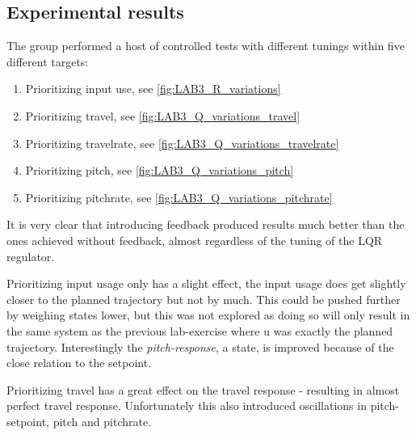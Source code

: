 \documentclass[../main.tex]{subfiles}
\begin{document}

\subsection{Experimental results}\label{sec:lab3_result}
The group performed a host of controlled tests with different tunings within five different targets:
\begin{enumerate}
	\item Prioritizing input use, see \cref{fig:LAB3_R_variations}
	\item Prioritizing travel, see \cref{fig:LAB3_Q_variations_travel}
	\item Prioritizing travelrate, see \cref{fig:LAB3_Q_variations_travelrate}
	\item Prioritizing pitch, see \cref{fig:LAB3_Q_variations_pitch}
	\item Prioritizing pitchrate, see \cref{fig:LAB3_Q_variations_pitchrate}
\end{enumerate}

It is very clear that introducing feedback produced results much better than the ones achieved without feedback, almost regardless of the tuning of the LQR regulator.

Prioritizing input usage only has a slight effect, the input usage does get slightly closer to the planned trajectory but not by much. This could be pushed further by weighing states lower, but this was not explored as doing so will only result in the same system as the previous lab-exercise where u was exactly the planned trajectory. Interestingly the \textit{pitch-response}, a state, is improved because of the close relation to the setpoint. 

Prioritizing travel has a great effect on the travel response - resulting in almost perfect travel response. Unfortunately this also introduced oscillations in pitch-setpoint, pitch and pitchrate.
\end{document}

